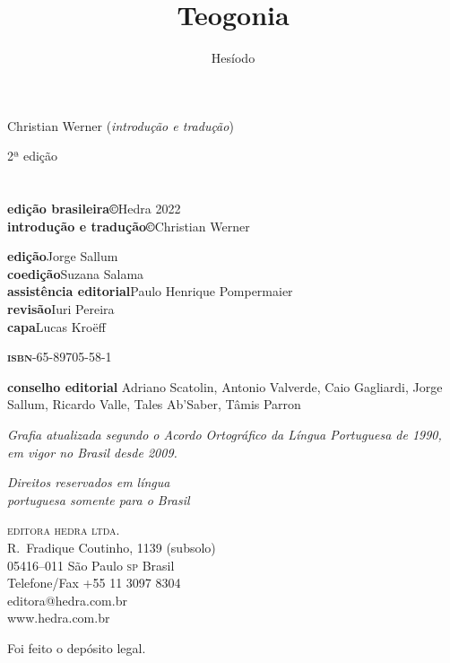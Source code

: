 \title{Teogonia}

\author{Hesíodo}

\chapter{}


Christian Werner (\textit{introdução e tradução})

2ª edição

\chapter{}

\textbf{edição brasileira©}\quad			 Hedra 2022\\
\textbf{introdução e tradução©}\quad		 Christian Werner

\textbf{edição}\quad			 			 Jorge Sallum\\
\textbf{coedição}\quad			 			 Suzana Salama\\
\textbf{assistência editorial}\quad			 Paulo Henrique Pompermaier\\
\textbf{revisão}\quad			 			 Iuri Pereira\\
\textbf{capa}\quad			 				 Lucas Kroëff

\textbf{\textsc{isbn}}-65-89705-58-1

\textbf{conselho editorial} Adriano Scatolin, Antonio Valverde, Caio Gagliardi, Jorge Sallum, Ricardo Valle, Tales Ab'Saber, Tâmis Parron
 
\textit{Grafia atualizada segundo o Acordo Ortográfico da Língua Portuguesa de 1990, em vigor no Brasil desde 2009.}

\vfill
\textit{Direitos reservados em língua\\ 
portuguesa somente para o Brasil}

\textsc{editora hedra ltda.}\\
R.~Fradique Coutinho, 1139 (subsolo)\\
05416--011 São Paulo \textsc{sp} Brasil\\
Telefone/Fax +55 11 3097 8304\\\smallskip
editora@hedra.com.br\\
www.hedra.com.br

Foi feito o depósito legal.

\chapter{}

